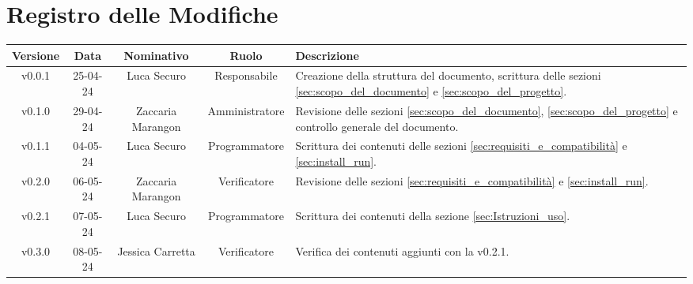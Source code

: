 \section*{\Large Registro delle Modifiche}
    \begin{table}[h]
        \centering
        \renewcommand\tabularxcolumn[1]{m{#1}} %
        \renewcommand{\arraystretch}{1.5}
        \begin{tabularx}{0.98\textwidth}
            {c|c|c|c|>{\centering\arraybackslash}X}
            \rowcolor{black}
            \textbf{\color{white} Versione} & \textbf{\color{white} Data} & \textbf{\color{white} Nominativo} & \textbf{\color{white} Ruolo} & \textbf{\color{white} Descrizione} \\ 
            \hline

            v0.0.1 & 25-04-24 & Luca Securo & Responsabile & Creazione della struttura del documento, scrittura delle sezioni \ref{sec:scopo_del_documento} e \ref{sec:scopo_del_progetto}.\\
            v0.1.0 & 29-04-24 & Zaccaria Marangon & Amministratore & Revisione delle sezioni \ref{sec:scopo_del_documento}, \ref{sec:scopo_del_progetto} e controllo generale del documento.\\
            v0.1.1 & 04-05-24 & Luca Securo & Programmatore & Scrittura dei contenuti delle sezioni \ref{sec:requisiti_e_compatibilità} e \ref{sec:install_run}.\\
            v0.2.0 & 06-05-24 & Zaccaria Marangon & Verificatore & Revisione delle sezioni \ref{sec:requisiti_e_compatibilità} e \ref{sec:install_run}.\\
            v0.2.1 & 07-05-24 & Luca Securo & Programmatore & Scrittura dei contenuti della sezione \ref{sec:Istruzioni_uso}.\\
            v0.3.0 & 08-05-24 & Jessica Carretta & Verificatore & Verifica dei contenuti aggiunti con la v0.2.1.\\
            
            \hline
        \end{tabularx}
    \end{table}